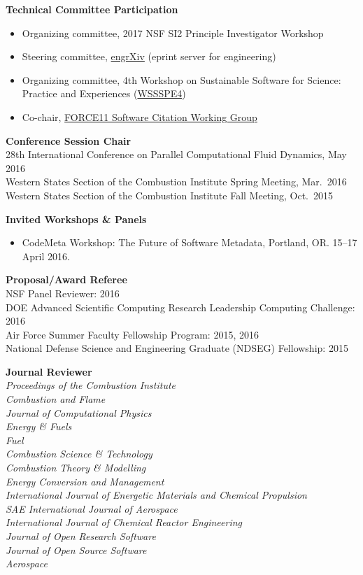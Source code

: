 \documentclass[margin,line,11pt]{res}
\begin{document}
\begin{resume}
\textbf{Technical Committee Participation}
\begin{itemize}[leftmargin=*]
\item Organizing committee, 2017 NSF SI2 Principle Investigator Workshop
\item Steering committee, \href{http://blog.engrxiv.org/}{engrXiv} (eprint server for engineering)
\item Organizing committee, 4th Workshop on Sustainable Software for Science: Practice and Experiences (\href{http://wssspe.researchcomputing.org.uk/wssspe4/}{WSSSPE4})
\item Co-chair, \href{https://www.force11.org/group/software-citation-working-group}{FORCE11 Software Citation Working Group}
\end{itemize}

\textbf{Conference Session Chair} \\
28th International Conference on Parallel Computational Fluid Dynamics, May 2016 \\
Western States Section of the Combustion Institute Spring Meeting, Mar.\ 2016 \\
Western States Section of the Combustion Institute Fall Meeting, Oct.\ 2015

\textbf{Invited Workshops \& Panels}
\begin{itemize}[leftmargin=*]
\item CodeMeta Workshop: The Future of Software Metadata, Portland, OR. 15--17 April 2016.
\end{itemize}

\textbf{Proposal\slash Award Referee} \\
NSF Panel Reviewer: 2016 \\
DOE Advanced Scientific Computing Research Leadership Computing Challenge: 2016 \\
Air Force Summer Faculty Fellowship Program: 2015, 2016 \\
National Defense Science and Engineering Graduate (NDSEG) Fellowship: 2015

\textbf{Journal Reviewer} \\
\emph{Proceedings of the Combustion Institute}\\
\emph{Combustion and Flame}\\
\emph{Journal of Computational Physics}\\
\emph{Energy \& Fuels}\\
\emph{Fuel}\\
\emph{Combustion Science \& Technology}\\
\emph{Combustion Theory \& Modelling}\\
\emph{Energy Conversion and Management}\\
\emph{International Journal of Energetic Materials and Chemical Propulsion}\\
\emph{SAE International Journal of Aerospace}\\
\emph{International Journal of Chemical Reactor Engineering} \\
\emph{Journal of Open Research Software} \\
\emph{Journal of Open Source Software} \\
\emph{Aerospace}


\end{resume}
\end{document}

